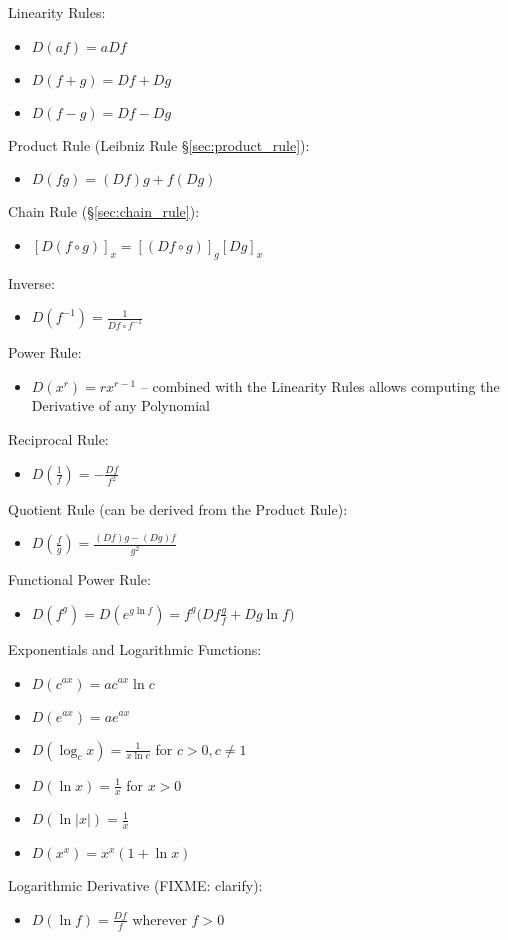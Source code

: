 Linearity Rules:
\begin{itemize}
  \item $D(af) = a Df$
  \item $D(f+g) = Df + Dg$
  \item $D(f-g) = Df - Dg$
\end{itemize}
Product Rule (Leibniz Rule \S\ref{sec:product_rule}):
\begin{itemize}
  \item $D(fg) = (Df)g + f(Dg)$
\end{itemize}
Chain Rule (\S\ref{sec:chain_rule}):
\begin{itemize}
  \item $[D(f \circ g)]_x = [(Df \circ g)]_g [Dg]_x$
\end{itemize}
Inverse:
\begin{itemize}
  \item $D(f^{-1}) = \frac{1}{Df \circ f^{-1}}$
\end{itemize}
Power Rule:
\begin{itemize}
  \item $D(x^r) = rx^{r-1}$ -- combined with the Linearity Rules allows
    computing the Derivative of any Polynomial
\end{itemize}
Reciprocal Rule:
\begin{itemize}
  \item $D(\frac{1}{f}) = -\frac{Df}{f^2}$
\end{itemize}
Quotient Rule (can be derived from the Product Rule):
\begin{itemize}
  \item $D(\frac{f}{g}) = \frac{(Df)g - (Dg)f}{g^2}$
\end{itemize}
Functional Power Rule:
\begin{itemize}
  \item $D(f^g) = D(e^{g \ln f}) = f^g \big(Df \frac{g}{f} + Dg \ln f\big)$
\end{itemize}
Exponentials and Logarithmic Functions:
\begin{itemize}
  \item $D(c^{ax}) = a c^{ax} \ln{c}$
  \item $D(e^{ax}) = a e^{ax}$
  \item $D(\log_c{x}) = \frac{1}{x \ln c}$ for $c > 0, c \neq 1$
  \item $D(\ln{x}) = \frac{1}{x}$ for $x > 0$
  \item $D(\ln{|x|}) = \frac{1}{x}$
  \item $D(x^x) = x^x(1 + \ln{x})$
\end{itemize}
Logarithmic Derivative (FIXME: clarify):
\begin{itemize}
  \item $D(\ln{f}) = \frac{Df}{f}$ wherever $f > 0$
\end{itemize}


